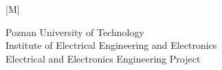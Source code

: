 \begin{center}
	\makeatletter
	\renewcommand{\arraystretch}{2.0}%

\begin{tabular}{|M{\linewidth}|}
	\hline
	
	{\LARGE Poznan University of Technology}\\
	{\LARGE Institute of Electrical Engineering and Electronics}\\
	{\LARGE Electrical and Electronics Engineering Project}\\ \hline
    \\ \hline
	 \\ \hline
	 \\
	\hline
	
\end{tabular}
\makeatother
\vspace{1.5cm}
\end{center}